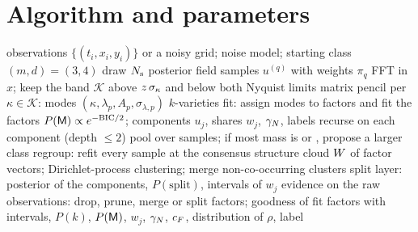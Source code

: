 \section{Algorithm and parameters}\label{app:algo}
\begin{algorithm}[htbp]
\caption{Grouping-based identification of a constant-coefficient PDE}\label{alg:full}
\begin{algorithmic}[1]
\Require observations $\{(t_i,x_i,y_i)\}$ or a noisy grid; noise model; starting class $(m,d)=(3,4)$
\State draw $N_{\mathrm s}$ posterior field samples $u^{(q)}$ with weights $\pi_q$ 
\Repeat {}
    \State FFT in $x$; keep the band $\mathcal K$ above $z\,\sigma_{\kappa}$ and below both Nyquist limits 
    \State matrix pencil per $\kappa\in\mathcal K$: modes $(\kappa,\lambda_p,A_p,\sigma_{\lambda,p})$ 
      \State $k$-varieties fit: assign modes to factors and fit the factors 
    \EndFor
    \State $P(\mathsf{M})\propto e^{-\mathrm{BIC}/2}$; components $u_j$, shares $w_j$, $\gamma_{N}$, labels 
    \State recurse on each component (depth $\le2$) 
  \EndFor
  \State pool over samples; if most mass is \MIS{} or \IDK, propose a larger class
\State regroup: refit every sample at the consensus structure
\State cloud $W$ of factor vectors; Dirichlet-process clustering; merge non-co-occurring clusters 
\State split layer: posterior of the components, $P(\text{split})$, intervals of $w_j$ 
\State evidence on the raw observations: drop, prune, merge or split factors; goodness of fit 
\State \Return factors with intervals, $P(k)$, $P(\mathsf{M})$, $w_j$, $\gamma_{N}$, $c_{F}$, distribution of $\rho$, label
\end{algorithmic}
\end{algorithm}

